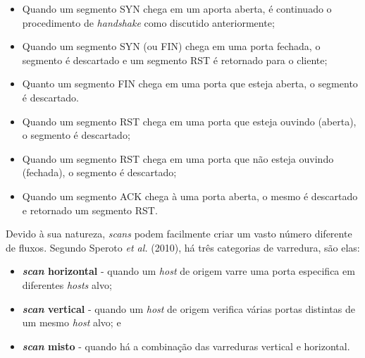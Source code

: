 \begin{itemize}
    \item Quando um segmento SYN chega em um aporta aberta, é continuado o procedimento de \textit{handshake} como discutido anteriormente; 
    \item Quando um segmento SYN (ou FIN) chega em uma porta fechada, o segmento é descartado e um segmento RST é retornado para o cliente;
    \item Quanto um segmento FIN chega em uma porta que esteja aberta, o segmento é descartado.
    \item Quando um segmento RST chega em uma porta que esteja ouvindo (aberta), o segmento é descartado;
    \item Quando um segmento RST chega em uma porta que não esteja ouvindo (fechada), o segmento é descartado;
    \item Quando um segmento ACK chega à uma porta aberta, o mesmo é descartado e retornado um segmento RST.
\end{itemize}


Devido à sua natureza, \textit{scans} podem facilmente criar um vasto número diferente de fluxos. Segundo Speroto \textit{et al.} (2010)\nocite{Sperotto:2010}, há três categorias de varredura, são elas:
\begin{itemize}
    \item \textbf{\textit{scan} horizontal} - quando um \textit{host} de origem varre uma porta especifica em diferentes \textit{hosts} alvo;
    \item \textbf{\textit{scan} vertical} - quando um \textit{host} de origem verifica várias portas distintas de um mesmo \textit{host} alvo; e
    \item \textbf{\textit{scan} misto} - quando há a combinação das varreduras vertical e horizontal.
\end{itemize}

